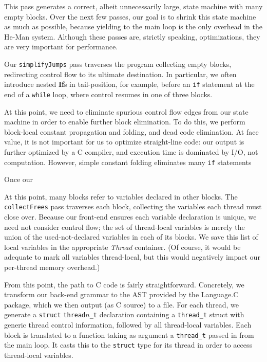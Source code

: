 \documentclass[preprint]{sigplanconf}
\renewcommand{\t}{\texttt}
\renewcommand{\b}{\textbf}
\renewcommand{\i}{\textit}
\begin{document}

This pass generates a correct, albeit unnecessarily large, state machine with
many empty blocks. Over the next few passes, our goal is to shrink this state
machine as much as possible, because yielding to the main loop is the only
overhead in the He-Man system. Although these passes are, strictly speaking,
optimizations, they are very important for performance.

Our \t{simplifyJumps} pass traverses the program collecting empty blocks,
redirecting control flow to its ultimate destination. In particular, we often
introduce nested \b{If}s in tail-position, for example, before an \t{if}
statement at the end of a \t{while} loop, where control resumes in one of three
blocks.

At this point, we need to eliminate spurious control flow edges from our state
machine in order to enable further block elimination. To do this, we perform
block-local constant propagation and folding, and dead code elimination. At face
value, it is not important for us to optimize straight-line code: our output is
further optimized by a C compiler, and execution time is dominated by I/O, not
computation. However, simple constant folding eliminates many \t{if} statements

Once our 

At this point, many blocks refer to variables declared in other blocks. The
\t{collectFrees} pass traverses each block, collecting the variables each thread
must close over. Because our front-end ensures each variable declaration is
unique, we need not consider control flow; the set of thread-local variables is
merely the union of the used-not-declared variables in each of its blocks.  We
save this list of local variables in the appropriate \i{Thread} container. (Of
course, it would be adequate to mark all variables thread-local, but this would
negatively impact our per-thread memory overhead.)

From this point, the path to C code is fairly straightforward. Concretely, we
transform our back-end grammar to the AST provided by the Language.C package,
which we then output (as C source) to a file. For each thread, we generate a
\t{struct} \t{thread$n$\_t} declaration containing a \t{thread\_t} struct with
generic thread control information, followed by all thread-local variables. Each
block is translated to a function taking as argument a \t{thread\_t} passed in
from the main loop. It casts this to the \t{struct} type for its thread in order
to access thread-local variables.
\end{document}
